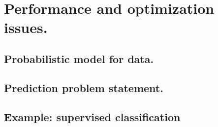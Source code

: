 \chapter{Performance and optimization issues.}

	\section{Probabilistic model for data.}

	\section{Prediction problem statement.}

	\section{Example: supervised classification}
